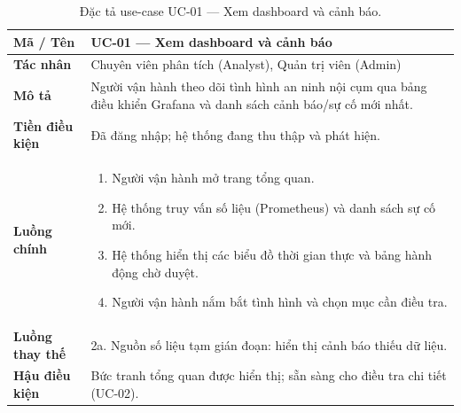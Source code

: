 \begin{table}[H]
  \centering
  \caption{Đặc tả use-case UC-01 --- Xem dashboard và cảnh báo.}
  \label{tab:uc01}
  \small
  \begin{tabularx}{\linewidth}{@{}>{\bfseries}l X@{}}
    \toprule
    Mã / Tên & UC-01 --- Xem dashboard và cảnh báo \\
    \midrule
    Tác nhân & Chuyên viên phân tích (Analyst), Quản trị viên (Admin) \\
    Mô tả & Người vận hành theo dõi tình hình an ninh nội cụm qua bảng điều khiển Grafana và danh sách cảnh báo/sự cố mới nhất. \\
    Tiền điều kiện & Đã đăng nhập; hệ thống đang thu thập và phát hiện. \\
    Luồng chính &
      \begin{enumerate}[nosep,leftmargin=*]
        \item Người vận hành mở trang tổng quan.
        \item Hệ thống truy vấn số liệu (Prometheus) và danh sách sự cố mới.
        \item Hệ thống hiển thị các biểu đồ thời gian thực và bảng hành động chờ duyệt.
        \item Người vận hành nắm bắt tình hình và chọn mục cần điều tra.
      \end{enumerate} \\
    Luồng thay thế & 2a. Nguồn số liệu tạm gián đoạn: hiển thị cảnh báo thiếu dữ liệu. \\
    Hậu điều kiện & Bức tranh tổng quan được hiển thị; sẵn sàng cho điều tra chi tiết (UC-02). \\
    \bottomrule
  \end{tabularx}
\end{table}

